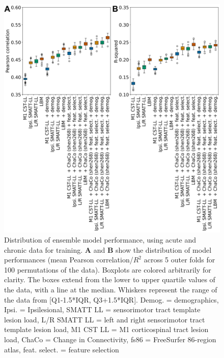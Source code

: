 \documentclass[10pt]{article}
\begin{document}
\begin{figure}[htp]
\centering
\includegraphics[width=1\linewidth]{figures/Analysis2_boxplots.png}
\caption{Distribution of ensemble model performance, using acute and chronic data for training. \textbf{A} and \textbf{B} show the distribution of model performances (mean Pearson correlation/$R^2$ across 5 outer folds for 100 permutations of the data). Boxplots are colored arbitrarily for clarity. The boxes extend from the lower to upper quartile values of the data, with a line at the median. Whiskers represent the range of the data from [Q1-1.5*IQR, Q3+1.5*IQR].  Demog. = demographics, Ipsi. = Ipsilesional, SMATT LL = sensorimotor tract template lesion load, L/R SMATT LL = left and right sensorimotor tract template lesion load, M1 CST LL = M1 corticospinal tract lesion load, ChaCo = Change in Connectivity, fs86 = FreeSurfer 86-region atlas, feat. select. = feature selection}
\label{analysis2_boxplots}
\end{figure}
\end{document}
